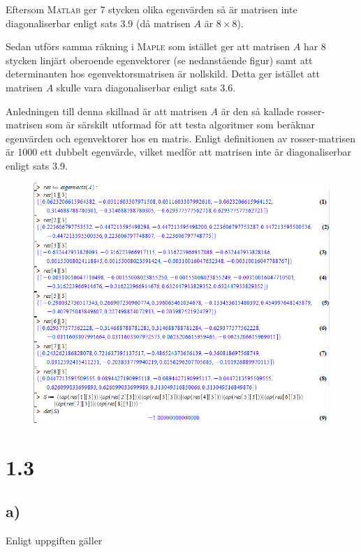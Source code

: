 \documentclass[a4paper]{article}
\newcommand{\mat}[1]{\bm{\mathit{#1}}}
\begin{document}
\noindent Eftersom \textsc{Matlab} ger 7 stycken olika egenvärden så är matrisen
inte diagonaliserbar enligt sats 3.9 (då matrisen $\mat{A}$ är $8\times 8$).

Sedan utförs samma räkning i \textsc{Maple} som istället ger att matrisen
$\mat{A}$ har 8 stycken linjärt oberoende egenvektorer (se nedanstående figur)
samt att determinanten hos egenvektorsmatrisen är nollskild. Detta ger istället
att matrisen $\mat{A}$ skulle vara diagonaliserbar enligt sats 3.6.

Anledningen till denna skillnad är att matrisen $\mat{A}$ är den så kallade
rosser-matrisen som är särskilt utformad för att testa algoritmer som beräknar
egenvärden och egenvektorer hos en matris. Enligt definitionen av
rosser-matrisen är 1000 ett dubbelt egenvärde, vilket medför att matrisen inte
är diagonaliserbar enligt sats 3.9.

\FloatBarrier
\begin{figure}[h!]
  \centering
  \includegraphics[width=\linewidth]{figurer/maple_1_2_b.png}
\end{figure}
\FloatBarrier

\section*{1.3}
\subsection*{a)}

Enligt uppgiften gäller
\end{document}
